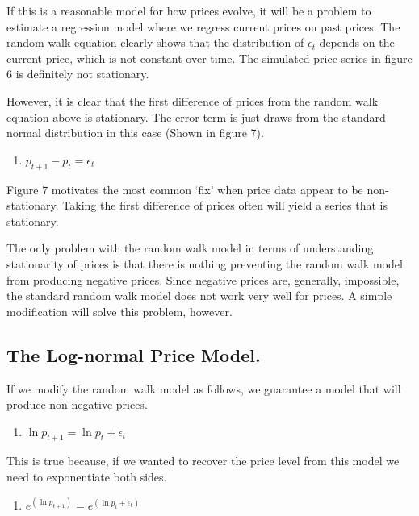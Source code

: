 \documentclass[]{book}
\providecommand{\tightlist}{%
  \setlength{\itemsep}{0pt}\setlength{\parskip}{0pt}}
\theoremstyle{definition}
\theoremstyle{definition}
\theoremstyle{remark}
\begin{document}
If this is a reasonable model for how prices evolve, it will be a
problem to estimate a regression model where we regress current prices
on past prices. The random walk equation clearly shows that the
distribution of \(\epsilon_t\) depends on the current price, which is
not constant over time. The simulated price series in figure 6 is
definitely not stationary.

However, it is clear that the first difference of prices from the random
walk equation above is stationary. The error term is just draws from the
standard normal distribution in this case (Shown in figure 7).

\begin{enumerate}
\def\labelenumi{(\arabic{enumi})}
\setcounter{enumi}{3}
\tightlist
\item
  \(p_{t+1} - p_{t} = \epsilon_t\)
\end{enumerate}

Figure 7 motivates the most common `fix' when price data appear to be
non-stationary. Taking the first difference of prices often will yield a
series that is stationary.

The only problem with the random walk model in terms of understanding
stationarity of prices is that there is nothing preventing the random
walk model from producing negative prices. Since negative prices are,
generally, impossible, the standard random walk model does not work very
well for prices. A simple modification will solve this problem, however.

\subsection{The Log-normal Price
Model.}\label{the-log-normal-price-model.}

If we modify the random walk model as follows, we guarantee a model that
will produce non-negative prices.

\begin{enumerate}
\def\labelenumi{(\arabic{enumi})}
\setcounter{enumi}{4}
\tightlist
\item
  \(\ln{p_{t+1}} = \ln{p_{t}} + \epsilon_t\)
\end{enumerate}

This is true because, if we wanted to recover the price level from this
model we need to exponentiate both sides.

\begin{enumerate}
\def\labelenumi{(\arabic{enumi})}
\setcounter{enumi}{5}
\tightlist
\item
  \(e^{(\ln{p_{t+1}})} = e^{(\ln{p_{t}} + \epsilon_t)}\)
\end{enumerate}
\end{document}

